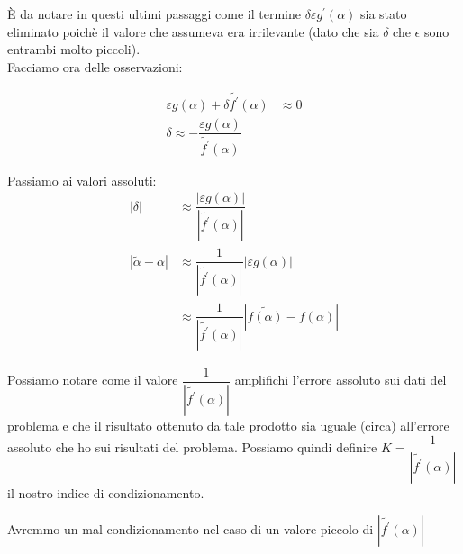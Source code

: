 \documentclass[12pt, a4paper]{book}
\theoremstyle{definition}
\begin{document}
\begin{flushleft}
 È da notare in questi ultimi passaggi come il termine $\delta \varepsilon g^{'}(\alpha)$ sia stato eliminato poichè il valore che assumeva era irrilevante (dato che sia $\delta$ che $\epsilon$ sono entrambi molto piccoli). \\
Facciamo ora delle osservazioni:

\begin{equation}
	\begin{split}
		 \varepsilon g(\alpha) + \delta \tilde{f^{'}}(\alpha) & \approx 0 \\
		 \delta \approx - \dfrac{\varepsilon g(\alpha)}{ \tilde{f^{'}}(\alpha)}
	\end{split}
\end{equation}


Passiamo ai valori assoluti:
\begin{equation}
	\begin{split}
		 | \delta | & \approx   \dfrac{| \varepsilon g(\alpha) |}{ | \tilde{f^{'}}(\alpha)| } \\
		 | \tilde{\alpha} - \alpha | & \approx \dfrac{1}{| \tilde{f^{'}}(\alpha)|} |\varepsilon g(\alpha)| \\
		 & \approx \dfrac{1}{| \tilde{f^{'}}(\alpha)|} | \tilde{f(\alpha)} - f(\alpha) |
	\end{split}
\end{equation}

Possiamo notare come il valore $\dfrac{1}{| \tilde{f^{'}}(\alpha)|}$ amplifichi l'errore assoluto sui dati del problema e che il risultato ottenuto da tale prodotto sia uguale (circa) all'errore assoluto che ho sui risultati del problema. Possiamo quindi definire $K = \dfrac{1}{| \tilde{f^{'}}(\alpha)|}$ il nostro indice di condizionamento.\\
\vspace{1em}

Avremmo un mal condizionamento nel caso di un valore piccolo di $|\tilde{f^{'}}(\alpha)|$
\end{flushleft}
\end{document}

